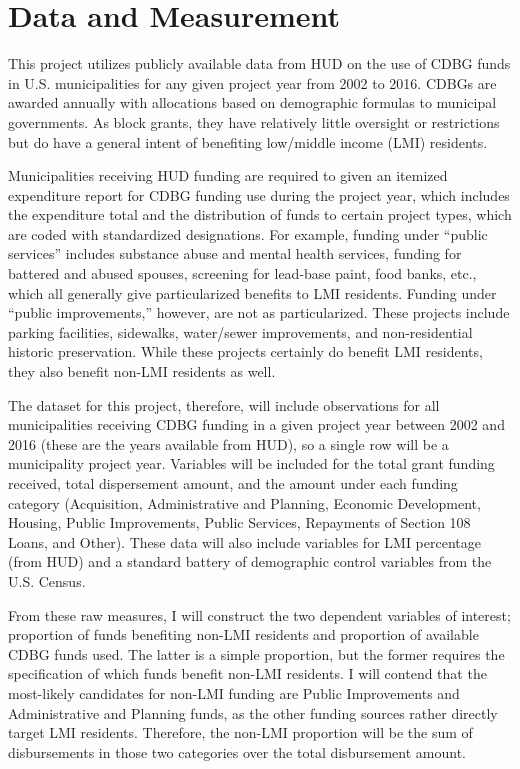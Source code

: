 \documentclass[12pt,a4paper]{article}
\begin{document}
\section{Data and Measurement}
\par This project utilizes publicly available data from HUD on the use of CDBG funds in U.S. municipalities for any given project year from 2002 to 2016. CDBGs are awarded annually with allocations based on demographic formulas to municipal governments. As block grants, they have relatively little oversight or restrictions but do have a general intent of benefiting low/middle income (LMI) residents.

\par Municipalities receiving HUD funding are required to given an itemized expenditure report for CDBG funding use during the project year, which includes the expenditure total and the distribution of funds to certain project types, which are coded with standardized designations. For example, funding under ``public services'' includes substance abuse and mental health services, funding for battered and abused spouses, screening for lead-base paint, food banks, etc., which all generally give particularized benefits to LMI residents. Funding under ``public improvements,'' however, are not as particularized. These projects include parking facilities, sidewalks, water/sewer improvements, and non-residential historic preservation. While these projects certainly do benefit LMI residents, they also benefit non-LMI residents as well.

\par The dataset for this project, therefore, will include observations for all municipalities receiving CDBG funding in a given project year between 2002 and 2016 (these are the years available from HUD), so a single row will be a municipality project year. Variables will be included for the total grant funding received, total dispersement amount, and the amount under each funding category (Acquisition, Administrative and Planning, Economic Development, Housing, Public Improvements, Public Services, Repayments of Section 108 Loans, and Other). These data will also include variables for LMI percentage (from HUD) and a standard battery of demographic control variables from the U.S. Census.

\par From these raw measures, I will construct the two dependent variables of interest; proportion of funds benefiting non-LMI residents and proportion of available CDBG funds used. The latter is a simple proportion, but the former requires the specification of which funds benefit non-LMI residents. I will contend that the most-likely candidates for non-LMI funding are Public Improvements and Administrative and Planning funds, as the other funding sources rather directly target LMI residents. Therefore, the non-LMI proportion will be the sum of disbursements in those two categories over the total disbursement amount.
\end{document}
